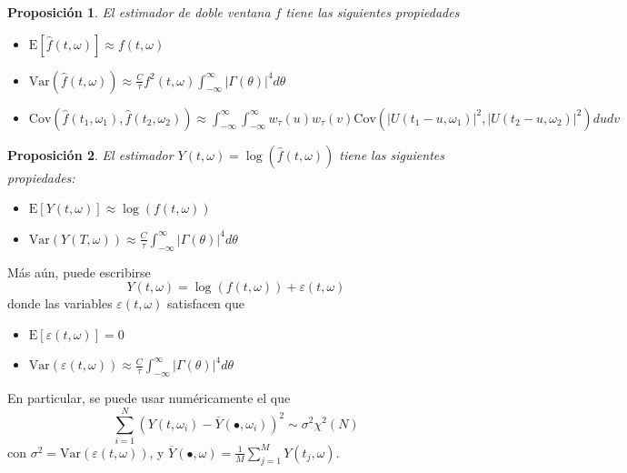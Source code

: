 \documentclass{beamer}
\newtheorem{prop}{Proposici\'on}
\newcommand{\intR}{\int_{-\infty}^{\infty}}
\newcommand{\est}[1]{\widehat{ #1 }}
\newcommand{\E}[1]{\mathrm{E}\left[ #1 \right]}
\newcommand{\Var}[1]{\mathrm{Var}\left( #1 \right)}
\newcommand{\Cov}[1]{\mathrm{Cov}\left( #1 \right)}
\newcommand{\abso}[1]{\left| #1 \right|}
\begin{document}
\begin{frame}%
\begin{prop}
El estimador de doble ventana $\widehat{f}$ tiene las siguientes propiedades
\begin{itemize}
\item $\displaystyle \E{\est{f}(t,\omega)} \approx f(t,\omega)$
\item $\displaystyle \Var{\est{f}(t,\omega)} \approx 
\frac{C}{\tau} f^{2}(t,\omega) \intR \abso{\Gamma (\theta)}^{4} d\theta$
\item $\displaystyle \Cov{\est{f}(t_1,\omega_1) , \est{f}(t_2,\omega_2)} \approx \intR \intR
w_\tau (u) w_\tau(v) \Cov{ \abso{U(t_1-u,\omega_1)}^{2} , \abso{U(t_2-u,\omega_2)}^{2} }
du dv$
\end{itemize}
\end{prop}

\begin{prop}
El estimador $ Y(t,\omega) = \log{\left( \est{f}(t,\omega)\right)}$
tiene las siguientes propiedades:
\begin{itemize}
\item $\displaystyle 
\E{ Y(t,\omega) } \approx \log \left( f(t,\omega) \right)$
\item $\displaystyle 
\Var{ Y(T,\omega) } 
\approx \frac{C}{\tau} \intR \abso{\Gamma (\theta)}^{4} d\theta $
\end{itemize}
\end{prop}
\end{frame}


\begin{frame}%

M\'as a\'un, puede escribirse
\begin{equation*}
Y(t,\omega) = \log \left( f(t,\omega) \right) + \varepsilon(t,\omega)
\end{equation*}
donde las variables $\varepsilon(t,\omega)$ satisfacen que
\begin{itemize}
\item $\displaystyle \E{\varepsilon(t,\omega)} = 0$
\item $\displaystyle \Var{\varepsilon(t,\omega)}
\approx \frac{C}{\tau} \intR \abso{\Gamma (\theta)}^{4} d\theta$
\end{itemize}

En particular, se puede usar num\'ericamente el que
\begin{equation*}
\sum_{i = 1 }^{N} \left( Y(t,\omega_i) - \overline{Y}(\bullet,\omega_i) \right)^{2} 
\sim \sigma^{2} \chi^{2}(N)
\end{equation*}
con $\sigma^{2} = \Var{\varepsilon(t,\omega)}$, y
$\overline{Y}(\bullet,\omega) = \frac{1}{M} \sum_{j=1}^{M} Y(t_j,\omega)$.
\end{frame}
\end{document}
